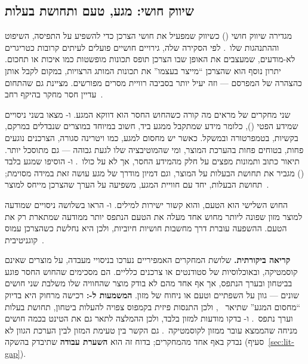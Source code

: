 \subsection{שיווק חושי: מגע, טעם ותחושת בעלות}
\label{subsec:lit-sensory}

 מגדירה שיווק חושי () כשיווק שמפעיל את חושי
הצרכן כדי להשפיע על התפיסה, השיפוט וההתנהגות שלו~\cite{krishna2012sensory}. לפי
הסקירה שלה, גירויים חושיים פועלים לעיתים קרובות כטריגרים לא-מודעים, שמעצבים את
האופן שבו הצרכן תופס תכונות מופשטות כמו איכות או תחכום. יתרון נוסף הוא שהצרכן
``מייצר בעצמו'' את תכונות המותג הרצויות, במקום לקבל אותן כהצהרה של המפרסם ---
וזה יעיל יותר בסביבה רוויית מסרים מפורשים.  מציינת גם שהתחום עדיין
חסר מחקר בהיקף רחב~\cite{krishna2012sensory}.

שני מחקרים של  מראים מה קורה כשהחוש החסר הוא דווקא המגע. 
ו- מצאו בשני ניסויים שמידע הפטי (), כלומר מידע שמתקבל
ממגע ביד, חשוב במיוחד במוצרים שנבדלים במרקם, בקשיות, בטמפרטורה ובמשקל. כאשר יש
מחסום למגע, כמו ויטרינה סגורה, הצרכנים נוגעים פחות, בטוחים פחות בהערכת המוצר,
ומי שהמוטיבציה שלו לגעת גבוהה --- גם מתוסכל יותר. תיאור כתוב ותמונות מפצים
על חלק מהמידע החסר, אך לא על כולו~\cite{peck2003have}.  ו-
הוסיפו שמגע בלבד () מגביר את תחושת הבעלות על המוצר, וגם דמיון
מודרך של מגע עושה זאת במידה מסוימת; תחושת הבעלות, יחד עם חוויית המגע, משפיעה על
הערך שהצרכן מייחס למוצר~\cite{peck2009effect}.

החוש השלישי הוא הטעם, והוא קשור ישירות למילים.  ו- הראו
בשלושה ניסויים שמודעה למוצר מזון שפונה ליותר מחוש אחד מעלה את
הטעם הנתפס יותר ממודעה שמתארת רק את הטעם. ההשפעה עוברת דרך מחשבות חושיות
חיוביות, ולכן היא נחלשת כשהצרכן עמוס קוגניטיבית~\cite{elder2010effects}.

\textbf{קריאה ביקורתית.} שלושת המחקרים האמפיריים נערכו בניסויי מעבדה, על מוצרים
שאינם קוסמטיקה, ובאוכלוסיות של סטודנטים או צרכנים כלליים. הם מסכימים שהחוש
החסר פוגע בביטחון ובערך הנתפס, אך אף אחד מהם לא בודק מוצר שהחוויה שלו משלבת
שני חושים שונים --- גוון על השפתיים וטעם או ניחוח של מזון.
\textbf{המשמעות ל-:} רכישה מרחוק היא בדיוק ``מחסום המגע'' שתיאר
~\cite{peck2003have}, ולכן התנסות פיזית בקמפוס צפויה להעלות ביטחון,
תחושת בעלות וערך נתפס~\cite{peck2009effect}.  ו- בדקו
מודעות למזון בלבד, ולכן ההמלצה לתאר גם את הטינט בכמה חושים מניחה שהממצא עובר
ממזון לקוסמטיקה~\cite{elder2010effects}. גם הקשר בין טעימת המזון לבין הערכת הגוון
לא נבדק באף אחד מהמחקרים; בדוח זה הוא \textbf{השערת עבודה} שתיבדק בהשקה
(סעיף~\ref{sec:lit-gap}).

